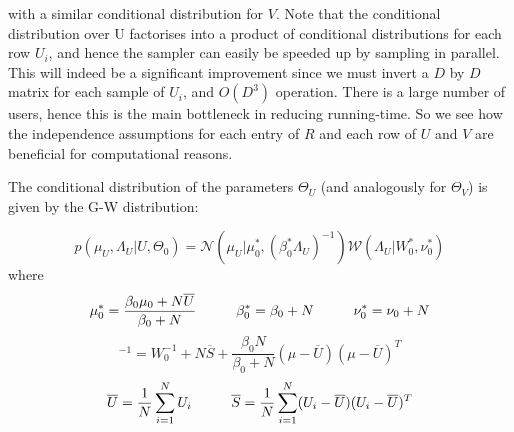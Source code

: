 \documentclass{article}
\theoremstyle{plain}
\begin{document}
with a similar conditional distribution for $V$. Note that the conditional distribution over U factorises into a product of conditional distributions for each row $U_i$, and hence the sampler can easily be speeded up by sampling in parallel. This will indeed be a significant improvement since we must invert a $D$ by $D$ matrix for each sample of $U_i$, and $O(D^3)$ operation. There is a large number of users, hence this is the main bottleneck in reducing running-time. So we see how the independence assumptions for each entry of $R$ and each row of $U$ and $V$ are beneficial for computational reasons.

\begin{minipage}{\textwidth}
The conditional distribution of the parameters $\Theta_U$ (and analogously for $\Theta_V$) is given by the G-W distribution:

\begin{equation}
p(\mu_U,\Lambda_U|U,\Theta_0)=\mathcal{N}(\mu_U|\mu_0^*,(\beta_0^* \Lambda_U)^{-1})\mathcal{W}(\Lambda_U|W_0^*,\nu_0^*)
\end{equation}
where
\begin{equation}
\mu_0^*=\frac{\beta_0\mu_0+N\overline{U}}{\beta_0+N} \hspace{10 mm}
\beta_0^*=\beta_0+N
\hspace{10 mm}
\nu_0^*=\nu_0+N
\end{equation}
\begin{equation}
[W_0^*]^{-1}=W_0^{-1}+N\overline{S}+\frac{\beta_0N}{\beta_0+N}(\mu-\overline{U})(\mu-\overline{U})^T
\end{equation}
\begin{equation}
\overline{U}=\frac{1}{N}\sum_{i=1}^N U_i \hspace{10 mm} \overline{S}=\frac{1}{N}\sum_{i=1}^N (U_i-\overline{U})(U_i-\overline{U})^T
\end{equation}
\end{minipage}
\end{document}
